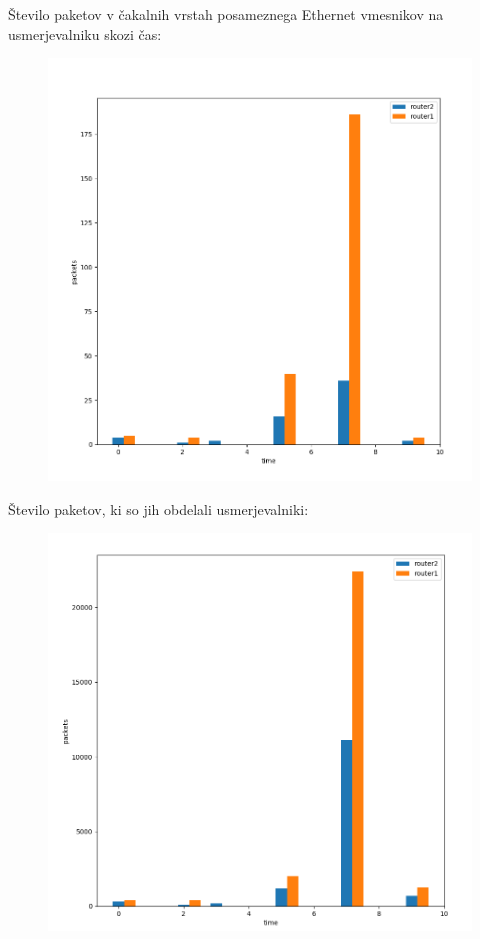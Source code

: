 \documentclass[11pt,a4paper,slovene]{myarticle}
\begin{document}
Število paketov v čakalnih vrstah posameznega Ethernet vmesnikov na usmerjevalniku skozi čas:
\begin{figure}[h]
  \includegraphics[width=\linewidth]{queuelength-1.png}
\end{figure}

\pagebreak

Število paketov, ki so jih obdelali usmerjevalniki:
\begin{figure}[h]
  \includegraphics[width=\linewidth]{packets-1.png}
\end{figure}
\end{document}
